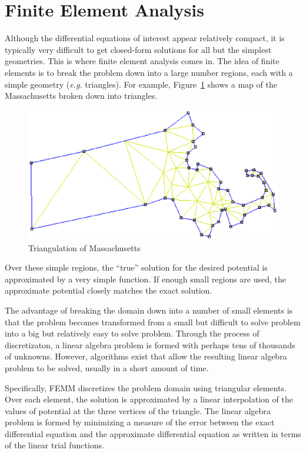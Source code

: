\documentclass[12pt]{report}
\begin{document}
\section{Finite Element Analysis}

Although the differential equations of interest appear relatively
compact, it is typically very difficult to get closed-form
solutions for all but the simplest geometries.  This is where
finite element analysis comes in.  The idea of finite elements is
to break the problem down into a large number regions, each with a
simple geometry ({\em e.g.} triangles).  For example,
Figure~{\ref{mass}} shows a map of the Massachusetts broken down
into triangles.
\begin{figure}
\centerline{\includegraphics{mass.ps}}
\caption{Triangulation of Massachusetts}
\label{mass}
\end{figure}
Over these simple regions, the ``true'' solution for the desired
potential is approximated by a very simple function.  If enough
small regions are used, the approximate potential closely matches
the exact solution.

The advantage of breaking the domain down into a number of small
elements is that the problem becomes transformed from a small but
difficult to solve problem into a big but relatively easy to solve
problem.  Through the process of discretizaton, a linear algebra
problem is formed with perhaps tens of thousands of unknowns.
However, algorithms exist that allow the resulting linear algebra
problem to be solved, usually in a short amount of time.

Specifically, FEMM discretizes the problem domain using triangular
elements. Over each element, the solution is approximated by a
linear interpolation of the values of potential at the three
vertices of the triangle. The linear algebra problem is formed by
minimizing a measure of the error between the exact differential
equation and the approximate differential equation as written in
terms of the linear trial functions.
\end{document}
